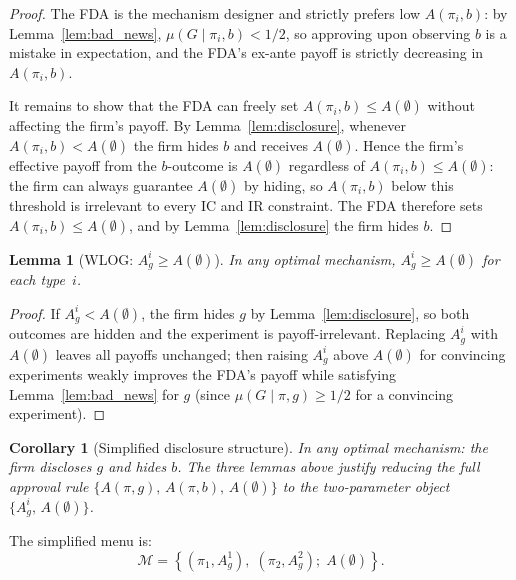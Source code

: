 \documentclass[12pt,a4paper]{article}
\newtheorem{lemma}{Lemma}
\newtheorem{corollary}{Corollary}
\begin{document}
\begin{proof}
The FDA is the mechanism designer and strictly prefers low
$A(\pi_i, b)$: by Lemma~\ref{lem:bad_news},
$\mu(G \mid \pi_i, b) < 1/2$, so approving upon observing
$b$ is a mistake in expectation, and the FDA's ex-ante
payoff is strictly decreasing in $A(\pi_i, b)$.

It remains to show that the FDA can freely set
$A(\pi_i, b) \leq A(\emptyset)$ without affecting the
firm's payoff. By Lemma~\ref{lem:disclosure}, whenever
$A(\pi_i, b) < A(\emptyset)$ the firm hides $b$ and
receives $A(\emptyset)$. Hence the firm's effective payoff
from the $b$-outcome is $A(\emptyset)$ regardless of
$A(\pi_i, b) \leq A(\emptyset)$: the firm can always
guarantee $A(\emptyset)$ by hiding, so $A(\pi_i, b)$ below
this threshold is irrelevant to every IC and IR constraint.
The FDA therefore sets $A(\pi_i, b) \leq A(\emptyset)$,
and by Lemma~\ref{lem:disclosure} the firm hides $b$.
\end{proof}

\begin{lemma}[WLOG: $A_g^i \geq A(\emptyset)$]
\label{lem:wlog_Ag}
In any optimal mechanism, $A_g^i \geq A(\emptyset)$ for each
type~$i$.
\end{lemma}

\begin{proof}
If $A_g^i < A(\emptyset)$, the firm hides $g$ by
Lemma~\ref{lem:disclosure}, so both outcomes are hidden and
the experiment is payoff-irrelevant. Replacing $A_g^i$ with
$A(\emptyset)$ leaves all payoffs unchanged; then raising
$A_g^i$ above $A(\emptyset)$ for convincing experiments
weakly improves the FDA's payoff while satisfying
Lemma~\ref{lem:bad_news} for $g$ (since
$\mu(G \mid \pi, g) \geq 1/2$ for a convincing experiment).
\end{proof}

\begin{corollary}[Simplified disclosure structure]
\label{cor:disclosure}
In any optimal mechanism: the firm discloses $g$ and hides
$b$. The three lemmas above justify reducing the full
approval rule $\{A(\pi,g),\,A(\pi,b),\,A(\emptyset)\}$ to
the two-parameter object $\{A_g^i,\,A(\emptyset)\}$.
\end{corollary}

The simplified menu is:
\begin{equation}\label{eq:menu}
  \mathcal{M} = \left\{
    \left(\pi_1, A_g^1\right),\;
    \left(\pi_2, A_g^2\right);\;
    A(\emptyset)
  \right\}.
\end{equation}
\end{document}
